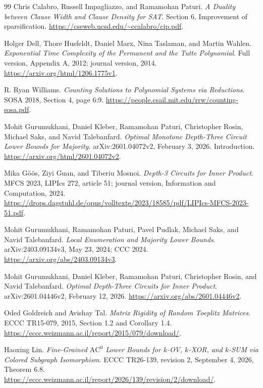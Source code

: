 \documentclass[11pt]{article}
\begin{document}
\begin{thebibliography}{99}
Chris Calabro, Russell Impagliazzo, and Ramamohan Paturi.
\emph{A Duality between Clause Width and Clause Density for SAT}.
Section 6, Improvement of sparsification.
\url{https://cseweb.ucsd.edu/~ccalabro/cip.pdf}.

Holger Dell, Thore Husfeldt, Daniel Marx, Nina Taslaman, and Martin Wahlen.
\emph{Exponential Time Complexity of the Permanent and the Tutte Polynomial}.
Full version, Appendix A, 2012; journal version, 2014.
\url{https://arxiv.org/html/1206.1775v1}.

R. Ryan Williams.
\emph{Counting Solutions to Polynomial Systems via Reductions}.
SOSA 2018, Section 4, page 6:9.
\url{https://people.csail.mit.edu/rrw/counting-sosa.pdf}.

Mohit Gurumukhani, Daniel Kleber, Ramamohan Paturi, Christopher Rosin,
Michael Saks, and Navid Talebanfard.
\emph{Optimal Monotone Depth-Three Circuit Lower Bounds for Majority}.
arXiv:2601.04072v2, February 3, 2026. Introduction.
\url{https://arxiv.org/html/2601.04072v2}.

Mika G\"o\"os, Ziyi Guan, and Tiberiu Mosnoi.
\emph{Depth-3 Circuits for Inner Product}.
MFCS 2023, LIPIcs 272, article 51; journal version, Information and
Computation, 2024.
\url{https://drops.dagstuhl.de/opus/volltexte/2023/18585/pdf/LIPIcs-MFCS-2023-51.pdf}.

Mohit Gurumukhani, Ramamohan Paturi, Pavel Pudlak, Michael Saks,
and Navid Talebanfard.
\emph{Local Enumeration and Majority Lower Bounds}.
arXiv:2403.09134v3, May 23, 2024; CCC 2024.
\url{https://arxiv.org/abs/2403.09134v3}.

Mohit Gurumukhani, Daniel Kleber, Ramamohan Paturi, Christopher Rosin,
and Navid Talebanfard.
\emph{Optimal Depth-Three Circuits for Inner Product}.
arXiv:2601.04446v2, February 12, 2026.
\url{https://arxiv.org/abs/2601.04446v2}.

Oded Goldreich and Avishay Tal.
\emph{Matrix Rigidity of Random Toeplitz Matrices}.
ECCC TR15-079, 2015, Section 1.2 and Corollary 1.4.
\url{https://eccc.weizmann.ac.il/report/2015/079/download/}.

Haoxing Lin.
\emph{Fine-Grained $\mathrm{AC}^0$ Lower Bounds for $k$-OV, $k$-XOR,
and $k$-SUM via Colored Subgraph Isomorphism}.
ECCC TR26-139, revision 2, September 4, 2026, Theorem 6.8.
\url{https://eccc.weizmann.ac.il/report/2026/139/revision/2/download/}.
\end{thebibliography}
\end{document}
